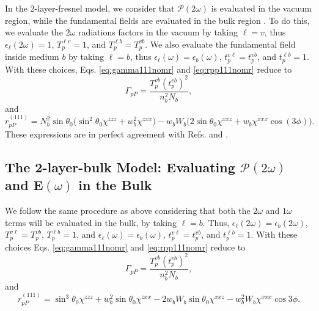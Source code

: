 In the 2-layer-fresnel model, we consider that
$\boldsymbol{\mathcal{P}}(2\omega)$ is evaluated in the vacuum region, while the
fundamental fields are evaluated in the bulk region \cite{sipePRB87,
mizrahiJOSA88}. To do this, we evaluate the $2\omega$ radiations factors in the
vacuum by taking $\ell = v$, thus $\epsilon_{\ell}(2\omega) = 1$, $T^{\ell
v}_{p} = 1$, and $T^{\ell b}_{p} = T^{vb}_{p}$. We also evaluate the fundamental
field inside medium $b$ by taking $\ell = b$, thus $\epsilon_{\ell}(\omega) =
\epsilon_{b}(\omega)$, $t^{v\ell}_{p} = t^{vb}_{p}$, and $t^{\ell b}_{p} = 1$.
With these choices, Eqs. \eqref{eq:gamma111nomr} and \eqref{eq:rpp111nomr}
reduce to
\begin{equation}\label{eq:m78}
\Gamma_{pP}
= \frac{T^{v b}_{p}(t^{vb}_{p})^2}{n^{2}_{b}N_{b}}, 
\end{equation}
and
\begin{equation}\label{eq:m82}
r^{(111)}_{pP} =
N^{2}_{b}\sin\theta_{0}
\Big(
\sin^{2}\theta_{0}\chi^{zzz} + w^{2}_{b}\chi^{zxx}
\Big)
- w_{b}W_{b}
\Big(
2\sin\theta_{0}\chi^{xxz} + w_{b}\chi^{xxx}\cos(3\phi)
\Big).
\end{equation}
These expressions are in perfect agreement with Refs. \cite{sipePRB87} and
\cite{mizrahiJOSA88}.



\subsection{The 2-layer-bulk Model: Evaluating
\texorpdfstring{$\boldsymbol{\mathcal{P}}(2\omega)$}{P(2w)} and
\texorpdfstring{$\mathbf{E}(\omega)$}{E(w)} in the Bulk}\label{sec:2-layer-bulk}

We follow the same procedure as above considering that both the $2\omega$ and
$1\omega$ terms will be evaluated in the bulk, by taking $\ell = b$. Thus,
$\epsilon_{\ell}(2\omega) = \epsilon_{b}(2\omega)$, $T^{v\ell}_{p} =
T^{vb}_{p}$, $T^{\ell b}_{p} = 1$, and $\epsilon_{\ell}(\omega) =
\epsilon_{b}(\omega)$, $t^{v\ell}_{p} = t^{vb}_{p}$, and $t^{\ell b}_{p} = 1$.
With these choices Eqs. \eqref{eq:gamma111nomr} and \eqref{eq:rpp111nomr} reduce
to
\begin{equation}
\Gamma_{pP} =
\frac{T_{p}^{vb}\left(t^{vb}_{p}\right)^{2}}{n^{2}_{b}N_{b}}, 
\end{equation}
and
\begin{equation}
r^{(111)}_{pP} = 
\sin^{3}\theta_{0}\chi^{zzz} + w^{2}_{b}\sin\theta_{0}\chi^{zxx} 
 - 2w_{b}W_{b}\sin\theta_{0}\chi^{xxz} - w^{2}_{b}W_{b}\chi^{xxx}\cos3\phi.
\end{equation}


